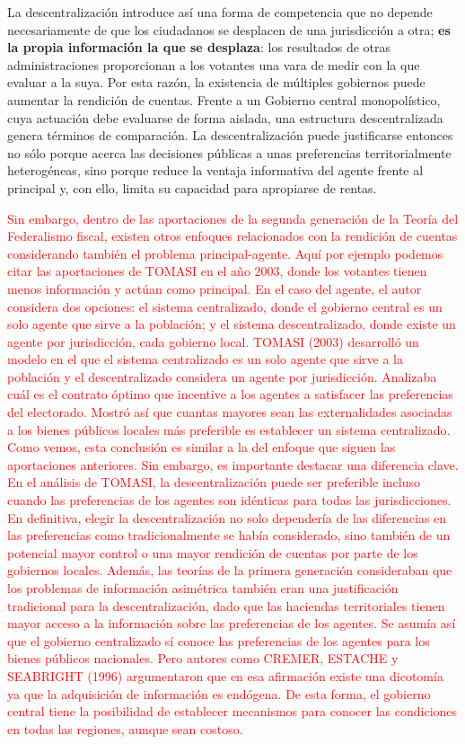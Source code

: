 \documentclass[10pt,a4paper]{article}
\begin{document}
La descentralización introduce así una forma de competencia que no depende necesariamente de que los ciudadanos se desplacen de una jurisdicción a otra; \textbf{es la propia información la que se desplaza}: los resultados de otras administraciones proporcionan a los votantes una vara de medir con la que evaluar a la suya. Por esta razón, la existencia de múltiples gobiernos puede aumentar la rendición de cuentas. Frente a un Gobierno central monopolístico, cuya actuación debe evaluarse de forma aislada, una estructura descentralizada genera términos de comparación. La descentralización puede justificarse entonces no sólo porque acerca las decisiones públicas a unas preferencias territorialmente heterogéneas, sino porque reduce la ventaja informativa del agente frente al principal y, con ello, limita su capacidad para apropiarse de rentas.

\textcolor{red}{Sin embargo, dentro de las aportaciones de la segunda generación de la Teoría del Federalismo fiscal, existen otros enfoques relacionados con la rendición de cuentas considerando también el problema principal-agente. Aquí por ejemplo podemos citar las aportaciones de TOMASI en el año 2003, donde los votantes tienen menos información y actúan como principal. En el caso del agente, el autor considera dos opciones: el sistema centralizado, donde el gobierno central es un solo agente que sirve a la población; y el sistema descentralizado, donde existe un agente por jurisdicción, cada gobierno local. TOMASI (2003) desarrolló un modelo en el que el sistema centralizado es un solo agente que sirve a la población y el descentralizado considera un agente por jurisdicción. Analizaba cuál es el contrato óptimo que incentive a los agentes a satisfacer las preferencias del electorado. Mostró así que cuantas mayores sean las externalidades asociadas a los bienes públicos locales más preferible es establecer un sistema centralizado. Como vemos, esta conclusión es similar a la del enfoque que siguen las aportaciones anteriores. Sin embargo, es importante destacar una diferencia clave. En el análisis de TOMASI, la descentralización puede ser preferible incluso cuando las preferencias de los agentes son idénticas para todas las jurisdicciones. En definitiva, elegir la descentralización no solo dependería de las diferencias en las preferencias como tradicionalmente se había considerado, sino también de un potencial mayor control o una mayor rendición de cuentas por parte de los gobiernos locales. Además, las teorías de la primera generación consideraban que los problemas de información asimétrica también eran una justificación tradicional para la descentralización, dado que las haciendas territoriales tienen mayor acceso a la información sobre las preferencias de los agentes. Se asumía así que el gobierno centralizado sí conoce las preferencias de los agentes para los bienes públicos nacionales. Pero autores como CREMER, ESTACHE y SEABRIGHT (1996) argumentaron que en esa afirmación existe una dicotomía ya que la adquisición de información es endógena. De esta forma, el gobierno central tiene la posibilidad de establecer mecanismos para conocer las condiciones en todas las regiones, aunque sean costoso.}
\end{document}
